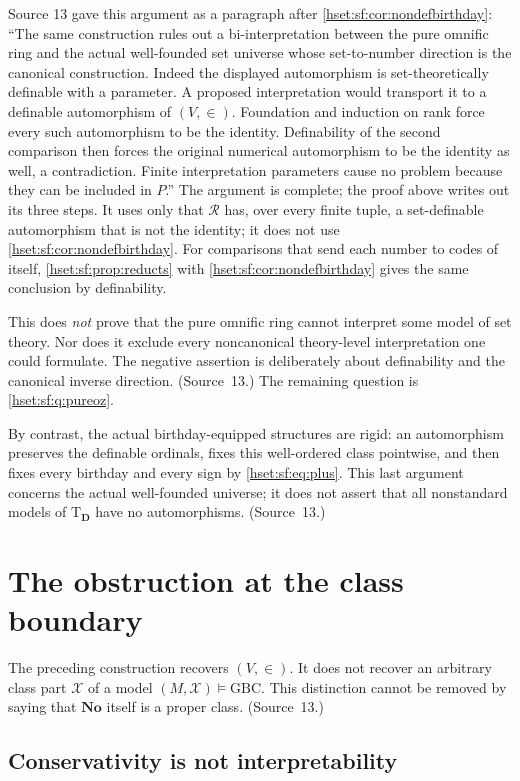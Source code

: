 \documentclass[11pt,letterpaper]{article}
\theoremstyle{definition}
\theoremstyle{remark}
\newcommand{\No}{\mathbf{No}}
\newcommand{\GBC}{\mathrm{GBC}}
\newcommand{\Dd}{\mathbf{D}}
\newcommand{\Tth}{\mathrm{T}}
\begin{document}
Source 13 gave this argument as a paragraph after
\cref{hset:sf:cor:nondefbirthday}: ``The same construction rules out a
bi-interpretation between the pure omnific ring and the actual well-founded set
universe whose set-to-number direction is the canonical construction. Indeed the
displayed automorphism is set-theoretically definable with a parameter. A proposed
interpretation would transport it to a definable automorphism of $(V,\in)$.
Foundation and induction on rank force every such automorphism to be the identity.
Definability of the second comparison then forces the original numerical
automorphism to be the identity as well, a contradiction. Finite interpretation
parameters cause no problem because they can be included in $P$.'' The argument is
complete; the proof above writes out its three steps. It uses only that
$\mathcal R$ has, over every finite tuple, a set-definable automorphism that is not
the identity; it does not use \cref{hset:sf:cor:nondefbirthday}. For comparisons
that send each number to codes of itself, \cref{hset:sf:prop:reducts} with
\cref{hset:sf:cor:nondefbirthday} gives the same conclusion by definability.

This does \emph{not} prove that the pure omnific ring cannot interpret some model
of set theory. Nor does it exclude every noncanonical theory-level interpretation
one could formulate. The negative assertion is deliberately about definability and
the canonical inverse direction. (Source~13.) The remaining question is
\cref{hset:sf:q:pureoz}.

By contrast, the actual birthday-equipped structures are rigid: an automorphism
preserves the definable ordinals, fixes this well-ordered class pointwise, and then
fixes every birthday and every sign by \eqref{hset:sf:eq:plus}. This last argument
concerns the actual well-founded universe; it does not assert that all nonstandard
models of $\Tth_{\Dd}$ have no automorphisms. (Source~13.)

\section{The obstruction at the class boundary}
\label{hset:sf:sec:classobstruction}

The preceding construction recovers $(V,\in)$. It does not recover an arbitrary
class part $\mathcal X$ of a model $(M,\mathcal X)\models\GBC$. This distinction
cannot be removed by saying that $\No$ itself is a proper class. (Source~13.)

\subsection{Conservativity is not interpretability}
\label{hset:sf:sub:reflection}
\end{document}
